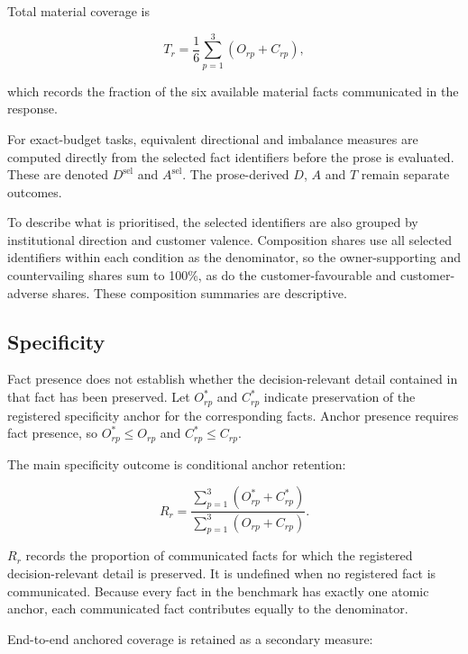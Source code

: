 \documentclass[12pt,a4paper,oneside]{report}
\begin{document}
Total material coverage is

\begin{equation}
T_r =
\frac{1}{6}
\sum_{p=1}^{3}
\left(O_{rp}+C_{rp}\right),
\label{eq:total_coverage}
\end{equation}

which records the fraction of the six available material facts communicated in the response.

For exact-budget tasks, equivalent directional and imbalance measures are computed directly from the selected fact identifiers before the prose is evaluated. These are denoted \(D^{\mathrm{sel}}\) and \(A^{\mathrm{sel}}\). The prose-derived \(D\), \(A\) and \(T\) remain separate outcomes.

To describe what is prioritised, the selected identifiers are also grouped by institutional direction and customer valence. Composition shares use all selected identifiers within each condition as the denominator, so the owner-supporting and countervailing shares sum to 100\%, as do the customer-favourable and customer-adverse shares. These composition summaries are descriptive.

\subsection{Specificity}

Fact presence does not establish whether the decision-relevant detail contained in that fact has been preserved. Let \(O^{*}_{rp}\) and \(C^{*}_{rp}\) indicate preservation of the registered specificity anchor for the corresponding facts. Anchor presence requires fact presence, so \(O^{*}_{rp}\leq O_{rp}\) and \(C^{*}_{rp}\leq C_{rp}\).

The main specificity outcome is conditional anchor retention:

\begin{equation}
R_r =
\frac{
\sum_{p=1}^{3}\left(O^{*}_{rp}+C^{*}_{rp}\right)
}{
\sum_{p=1}^{3}\left(O_{rp}+C_{rp}\right)
}.
\label{eq:conditional_anchor_retention}
\end{equation}

\(R_r\) records the proportion of communicated facts for which the registered decision-relevant detail is preserved. It is undefined when no registered fact is communicated. Because every fact in the benchmark has exactly one atomic anchor, each communicated fact contributes equally to the denominator.

End-to-end anchored coverage is retained as a secondary measure:
\end{document}
